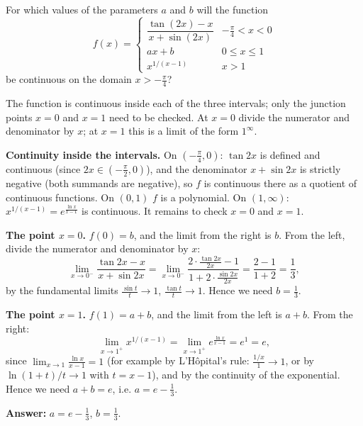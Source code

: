 
\begin{question}
For which values of the parameters $a$ and $b$ will the function
\[
f(x)=\begin{cases}\dfrac{\tan(2x)-x}{x+\sin(2x)} & -\frac\pi4<x<0\\[1ex] ax+b & 0\le x\le1\\[0.5ex] x^{1/(x-1)} & x>1\end{cases}
\]
be continuous on the domain $x>-\frac\pi4$?
\end{question}

\begin{hint}
The function is continuous inside each of the three intervals; only the junction points $x=0$ and $x=1$ need to be checked. At $x=0$ divide the numerator and denominator by $x$; at $x=1$ this is a limit of the form $1^\infty$.
\end{hint}

\begin{solution}
\textbf{Continuity inside the intervals.} On $\left(-\frac\pi4,0\right)$: $\tan2x$ is defined and continuous (since $2x\in\left(-\frac\pi2,0\right)$), and the denominator $x+\sin2x$ is strictly negative (both summands are negative), so $f$ is continuous there as a quotient of continuous functions. On $(0,1)$ $f$ is a polynomial. On $(1,\infty)$: $x^{1/(x-1)}=e^{\frac{\ln x}{x-1}}$ is continuous. It remains to check $x=0$ and $x=1$.

\textbf{The point $x=0$.} $f(0)=b$, and the limit from the right is $b$. From the left, divide the numerator and denominator by $x$:
\[
\lim_{x\to0^-}\frac{\tan2x-x}{x+\sin2x}=\lim_{x\to0^-}\frac{2\cdot\frac{\tan2x}{2x}-1}{1+2\cdot\frac{\sin2x}{2x}}=\frac{2-1}{1+2}=\frac13,
\]
by the fundamental limits $\frac{\sin t}{t}\to1$, $\frac{\tan t}{t}\to1$. Hence we need $b=\frac13$.

\textbf{The point $x=1$.} $f(1)=a+b$, and the limit from the left is $a+b$. From the right:
\[
\lim_{x\to1^+}x^{1/(x-1)}=\lim_{x\to1^+}e^{\frac{\ln x}{x-1}}=e^1=e,
\]
since $\lim_{x\to1}\frac{\ln x}{x-1}=1$ (for example by L'Hôpital's rule: $\frac{1/x}{1}\to1$, or by $\ln(1+t)/t\to1$ with $t=x-1$), and by the continuity of the exponential. Hence we need $a+b=e$, i.e. $a=e-\frac13$.

\textbf{Answer:} $a=e-\frac13$, $b=\frac13$.
\end{solution}
